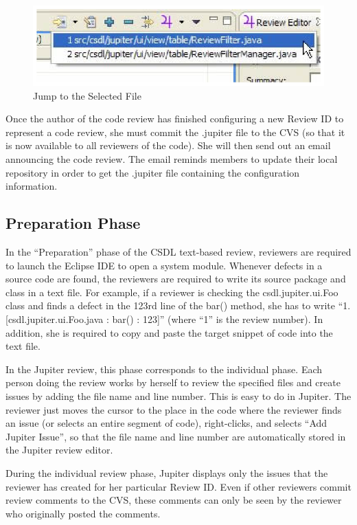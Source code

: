\begin{figure}[htbp]
  \centering
  \includegraphics{images/fig3-40.eps}
  \caption{Jump to the Selected File}
  \label{fig3-40}
\end{figure}

Once the author of the code review has finished configuring a new Review ID to represent a code review, she must commit the .jupiter file to the CVS (so that it is now available to all reviewers of the code).  She will then send out an email announcing the code review. The email reminds members to update their local repository in order to get the .jupiter file containing the configuration information. 

\subsection{Preparation Phase}
\label{subsec:preparation-phase}

In the ``Preparation'' phase of the CSDL text-based review, reviewers are required to launch the Eclipse IDE to open a system module. Whenever defects in a source code are found, the reviewers are required to write its source package and class in a text file. For example, if a reviewer is checking the csdl.jupiter.ui.Foo class and finds a defect in the 123rd line of the bar() method, she has to write ``1. [csdl.jupiter.ui.Foo.java : bar() : 123]'' (where ``1'' is the review number). In addition, she is required to copy and paste the target snippet of code into the text file.

In the Jupiter review, this phase corresponds to the individual phase. Each person doing the review works by herself to review the specified files and create issues by adding the file name and line number. This is easy to do in Jupiter. The reviewer just moves the cursor to the place in the code where the reviewer finds an issue (or selects an entire segment of code), right-clicks, and selects ``Add Jupiter Issue'', so that the file name and line number are automatically stored in the Jupiter review editor.

During the individual review phase, Jupiter displays only the issues that the reviewer has created for her particular Review ID. Even if other reviewers commit review comments to the CVS, these comments can only be seen by the reviewer who originally posted the comments.

